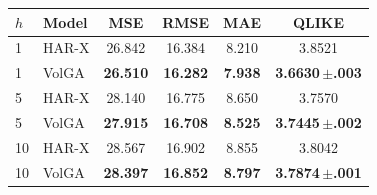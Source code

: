 \begin{tabular}{llcccc}
\toprule
$h$ & Model & MSE & RMSE & MAE & QLIKE \\
\midrule
1 & HAR-X & 26.842 & 16.384 & 8.210 & 3.8521 \\
1 & VolGA & \textbf{26.510} & \textbf{16.282} & \textbf{7.938} & \textbf{3.6630\,$\pm$.003} \\
\midrule
5 & HAR-X & 28.140 & 16.775 & 8.650 & 3.7570 \\
5 & VolGA & \textbf{27.915} & \textbf{16.708} & \textbf{8.525} & \textbf{3.7445\,$\pm$.002} \\
\midrule
10 & HAR-X & 28.567 & 16.902 & 8.855 & 3.8042 \\
10 & VolGA & \textbf{28.397} & \textbf{16.852} & \textbf{8.797} & \textbf{3.7874\,$\pm$.001} \\
\bottomrule
\end{tabular}
